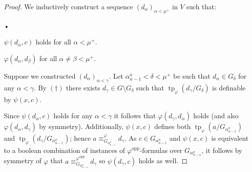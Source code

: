 \documentclass[a4paper]{amsart}
\theoremstyle{plain}
\theoremstyle{definition}
\theoremstyle{remark}
\numberwithin{equation}{section}
\DeclareMathOperator{\tp}{tp}
\begin{document}
\begin{proof}
%
%

We inductively construct a sequence $(d_\alpha)_{\alpha<\mu^+}$ in $V$ such that:
\begin{list}{•}{}
\item $\psi(d_\alpha,c)$ holds for all $\alpha<\mu^+$.
\item $\varphi(d_\alpha,d_\beta)$ for all $\alpha\neq \beta<\mu^+$.
\end{list}

Suppose we constructed $(d_\alpha)_{\alpha<\gamma}$. Let $\alpha_{n-1}^a<\delta<\mu^+$ be such that $d_\alpha\in G_\delta$ for any $\alpha<\gamma$. By $(\dagger)$ there exists $d_\gamma\in G\setminus G_\delta$ such that $\tp_\varphi(d_\gamma/G_\delta)$ is definable by $\psi(x,c)$.

Since $\psi(d_\alpha,c)$ holds for any $\alpha<\gamma$ it follows that $\varphi(d_\gamma,d_\alpha)$ holds (and also $\varphi(d_\alpha,d_\gamma)$ by symmetry). Additionally, $\psi(x,c)$ defines both $\tp_\varphi(a/G_{\alpha^a_{n-1}})$ and $\tp_\varphi(d_\gamma/G_{\alpha^a_{n-1}})$; hence $a\equiv^\varphi_{G_{\alpha^a_{n-1}}} d_\gamma$.  As $c\in G_{\alpha^a_{n-1}}$ and $\psi(x,c)$ is equivalent to a boolean combination of instances of $\varphi^{\text{opp}}$-formulas over $G_{\alpha^a_{n-1}}$, it follows by symmetry of $\varphi$ that $a\equiv^{\varphi^{\text{opp}}}_{G_{\alpha^a_{n-1}}} d_\gamma$ so $\psi(d_\gamma,c)$ holds as well.
%
%
%
%
\end{proof}
\end{document}
